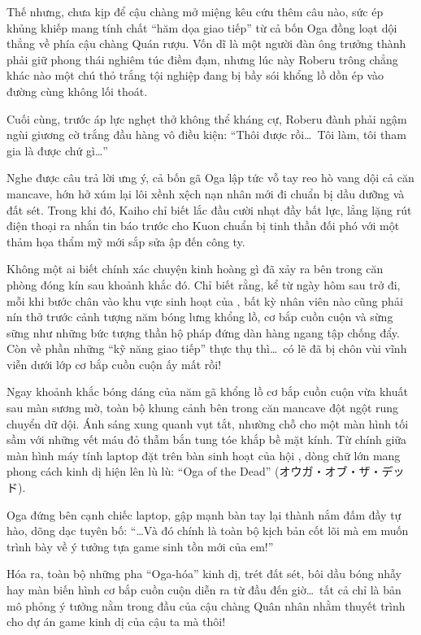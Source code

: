 \documentclass[../main.tex]{subfiles}
\begin{document}
Thế nhưng, chưa kịp để cậu chàng mở miệng kêu cứu thêm câu nào, sức ép khủng khiếp mang tính chất ``hăm dọa giao tiếp'' từ cả bốn Oga đồng loạt dội thẳng về phía cậu chàng Quán rượu. Vốn dĩ là một người đàn ông trưởng thành phải giữ phong thái nghiêm túc điềm đạm, nhưng lúc này Roberu trông chẳng khác nào một chú thỏ trắng tội nghiệp đang bị bầy sói khổng lồ dồn ép vào đường cùng không lối thoát.

Cuối cùng, trước áp lực nghẹt thở không thể kháng cự, Roberu đành phải ngậm ngùi giương cờ trắng đầu hàng vô điều kiện: ``Thôi được rồi\dots\ Tôi làm, tôi tham gia là được chứ gì\dots''

Nghe được câu trả lời ưng ý, cả bốn gã Oga lập tức vỗ tay reo hò vang dội cả căn mancave, hớn hở xúm lại lôi xềnh xệch nạn nhân mới đi chuẩn bị dầu dưỡng và đất sét. Trong khi đó, Kaiho chỉ biết lắc đầu cười nhạt đầy bất lực, lẳng lặng rút điện thoại ra nhắn tin báo trước cho Kuon chuẩn bị tinh thần đối phó với một thảm họa thẩm mỹ mới sắp sửa ập đến công ty.

Không một ai biết chính xác chuyện kinh hoàng gì đã xảy ra bên trong căn phòng đóng kín sau khoảnh khắc đó. Chỉ biết rằng, kể từ ngày hôm sau trở đi, mỗi khi bước chân vào khu vực sinh hoạt của \hls, bất kỳ nhân viên nào cũng phải nín thở trước cảnh tượng năm bóng lưng khổng lồ, cơ bắp cuồn cuộn và sừng sững như những bức tượng thần hộ pháp đứng dàn hàng ngang tập chống đẩy. Còn về phần những ``kỹ năng giao tiếp'' thực thụ thì\dots\ có lẽ đã bị chôn vùi vĩnh viễn dưới lớp cơ bắp cuồn cuộn ấy mất rồi!

\omk

Ngay khoảnh khắc bóng dáng của năm gã khổng lồ cơ bắp cuồn cuộn vừa khuất sau màn sương mờ, toàn bộ khung cảnh bên trong căn mancave đột ngột rung chuyển dữ dội. Ánh sáng xung quanh vụt tắt, nhường chỗ cho một màn hình tối sầm với những vết máu đỏ thẫm bắn tung tóe khắp bề mặt kính. Từ chính giữa màn hình máy tính laptop đặt trên bàn sinh hoạt của hội \hls, dòng chữ lớn mang phong cách kinh dị hiện lên lù lù: ``Oga of the Dead'' (オウガ・オブ・ザ・デッド).

Oga đứng bên cạnh chiếc laptop, gập mạnh bàn tay lại thành nắm đấm đầy tự hào, dõng dạc tuyên bố: ``\dots Và đó chính là toàn bộ kịch bản cốt lõi mà em muốn trình bày về ý tưởng tựa game sinh tồn mới của em!''

Hóa ra, toàn bộ những pha ``Oga-hóa'' kinh dị, trét đất sét, bôi dầu bóng nhẫy hay màn biến hình cơ bắp cuồn cuộn diễn ra từ đầu đến giờ\dots\ tất cả chỉ là bản mô phỏng ý tưởng nằm trong đầu của cậu chàng Quân nhân nhằm thuyết trình cho dự án game kinh dị của cậu ta mà thôi!
\end{document}
